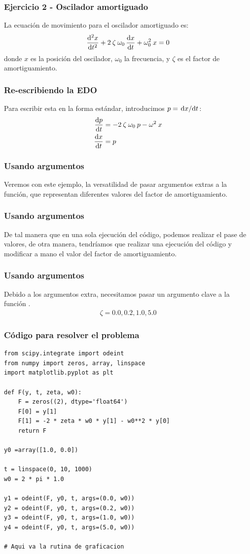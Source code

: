 \documentclass[12pt]{beamer}
\begin{document}
\begin{frame}
\frametitle{Ejercicio 2 - Oscilador amortiguado}
La ecuación de movimiento para el oscilador amortiguado es:
\pause
\begin{align*}
\dv[2]{x}{t} + 2 \: \zeta \:  \omega_{0} \, \dv{x}{t} + \omega_{0}^{2} \: x = 0
\end{align*}
donde $x$ es la posición del oscilador, $\omega_{0}$ la frecuencia, y $\zeta$ es el factor de amortiguamiento.
\end{frame}
\begin{frame}
\frametitle{Re-escribiendo la EDO}
Para escribir esta  en la forma estándar, introducimos $p = \dv*{x}{t}$:
\pause
\begin{align*}
\dv{p}{t} &= - 2 \: \zeta \: \omega_{0} \: p - \omega^{2} \: x \\
\dv{x}{t} &= p
\end{align*}
\end{frame}
\begin{frame}
\frametitle{Usando argumentos}
Veremos con este ejemplo, la versatilidad de pasar argumentos extras a la función, que representan diferentes valores del factor de amortiguamiento.
\end{frame}
\begin{frame}
\frametitle{Usando argumentos}
De tal manera que en una sola ejecución del código, podemos realizar el pase de valores, \pause de otra manera, tendríamos que realizar una ejecución del código y modificar a mano el valor del factor de amortiguamiento.
\end{frame}
\begin{frame}
\frametitle{Usando argumentos}
Debido a los argumentos extra, necesitamos pasar un argumento clave  a la función .
\pause
\begin{align*}
\zeta = 0.0, 0.2, 1.0, 5.0
\end{align*}
\end{frame}
\begin{frame}
\frametitle{Código para resolver el problema}
\begin{lstlisting}[caption=Código completo para el oscilador amortiguado]
from scipy.integrate import odeint
from numpy import zeros, array, linspace
import matplotlib.pyplot as plt

def F(y, t, zeta, w0):
    F = zeros((2), dtype='float64')
    F[0] = y[1]
    F[1] = -2 * zeta * w0 * y[1] - w0**2 * y[0]
    return F    

y0 =array([1.0, 0.0])

t = linspace(0, 10, 1000)
w0 = 2 * pi * 1.0

y1 = odeint(F, y0, t, args=(0.0, w0))
y2 = odeint(F, y0, t, args=(0.2, w0))
y3 = odeint(F, y0, t, args=(1.0, w0))
y4 = odeint(F, y0, t, args=(5.0, w0))

# Aqui va la rutina de graficacion
\end{lstlisting}
\end{frame}
\end{document}
